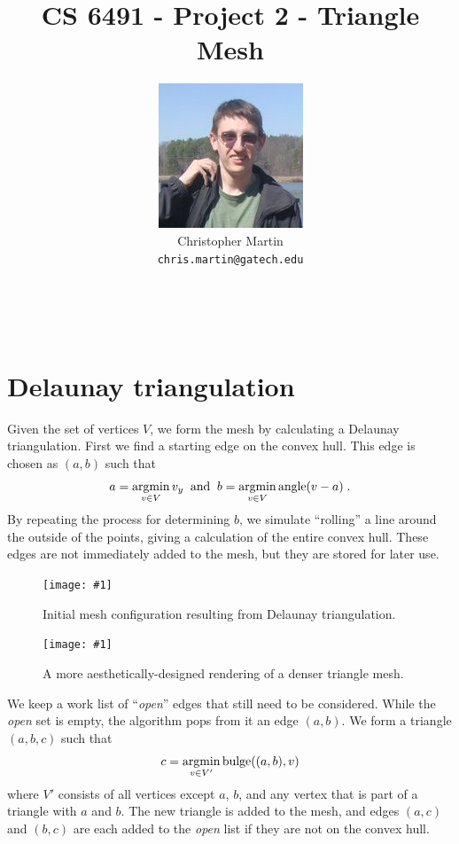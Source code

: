 \documentclass{article}
\title{\vspace{-60pt}CS 6491 - Project 2 - Triangle Mesh}
\author{
\begin{tabular}{ll}
\multirow{3}{*}{\includegraphics[scale=0.4]{chris.jpg}}\\&
Christopher Martin\\&\texttt{chris.martin@gatech.edu}\end{tabular}
~\\~\\~\\}
\newcommand\screenshot[1]{\texttt{[image: \#1]}}
\newcommand{\argmin}{\operatornamewithlimits{argmin}}
\begin{document}
\makeatletter
{}
\makeatother

\section{Delaunay triangulation}

Given the set of vertices $V$, we form
the mesh by calculating a Delaunay triangulation.
First we find a starting edge on the convex hull.
This edge is chosen as $(a,b)$ such that
\[ a = \argmin_{v \in V} v_y
\;\;\text{and}\;\;
b = \argmin_{v \in V} \textrm{angle}(v-a)
\;\text{.} \]
By repeating the process for determining $b$,
we simulate ``rolling'' a line around the outside
of the points, giving a calculation of the entire
convex hull.
These edges are not immediately added to the mesh,
but they are stored for later use.

\begin{figure}
\centering
\screenshot{init-debug}
\caption{Initial mesh configuration resulting
from Delaunay triangulation.}
\end{figure}

\begin{figure}
\centering
\screenshot{init}
\caption{A more aesthetically-designed rendering
of a denser triangle mesh.}
\end{figure}

We keep a work list of ``\textit{open}'' edges that
still need to be considered. While the \textit{open}
set is empty, the algorithm pops from it an edge $(a, b)$.
We form a triangle $(a,b,c)$ such that
\[ c = \argmin_{v \in V'} \text{bulge}((a,b), v) \]
where $V'$ consists of all vertices except $a$, $b$, and
any vertex that is part of a triangle with $a$ and $b$.
The new triangle is added to the mesh, and edges
$(a,c)$ and $(b,c)$ are each added to the \textit{open}
list if they are not on the convex hull.
\end{document}
